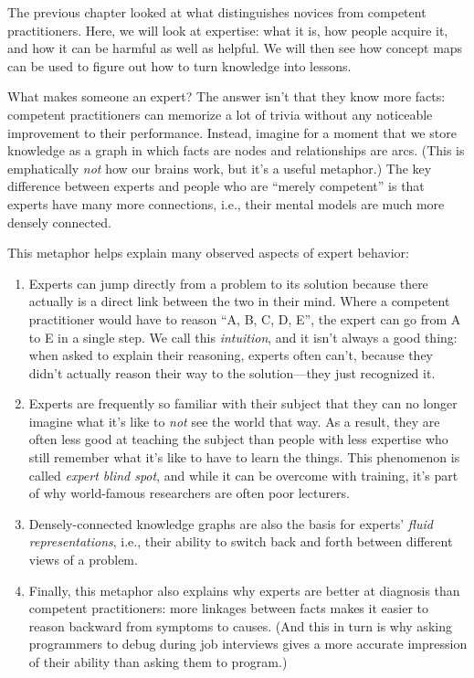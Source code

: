 
The previous chapter looked at what distinguishes novices from
competent practitioners.  Here, we will look at expertise: what it is,
how people acquire it, and how it can be harmful as well as helpful.
We will then see how concept maps can be used to figure out how to
turn knowledge into lessons.



What makes someone an expert? The answer isn't that they know more
facts: competent practitioners can memorize a lot of trivia without
any noticeable improvement to their performance.  Instead, imagine for
a moment that we store knowledge as a graph in which facts are nodes
and relationships are arcs. (This is emphatically \emph{not} how our
brains work, but it's a useful metaphor.) The key difference between
experts and people who are ``merely competent'' is that experts have
many more connections, i.e., their mental models are much more densely
connected.

This metaphor helps explain many observed aspects of expert behavior:

\begin{enumerate}

\item
  Experts can jump directly from a problem to its solution because
  there actually is a direct link between the two in their mind.
  Where a competent practitioner would have to reason ``A, B, C, D,
  E'', the expert can go from A to E in a single step. We call
  this \emph{intuition}, and it isn't always a good thing: when asked
  to explain their reasoning, experts often can't, because they didn't
  actually reason their way to the solution---they just recognized it.

\item
  Experts are frequently so familiar with their subject that they can
  no longer imagine what it's like to \emph{not} see the world that
  way. As a result, they are often less good at teaching the subject
  than people with less expertise who still remember what it's like to
  have to learn the things. This phenomenon is called \emph{expert
  blind spot}, and while it can be overcome with training, it's part
  of why world-famous researchers are often poor lecturers.

\item
  Densely-connected knowledge graphs are also the basis for experts'
  \emph{fluid representations}, i.e., their ability to switch back
  and forth between different views of a problem.  

\item
  Finally, this metaphor also explains why experts are better at
  diagnosis than competent practitioners: more linkages between facts
  makes it easier to reason backward from symptoms to causes. (And
  this in turn is why asking programmers to debug during job
  interviews gives a more accurate impression of their ability than
  asking them to program.)

\end{enumerate}

